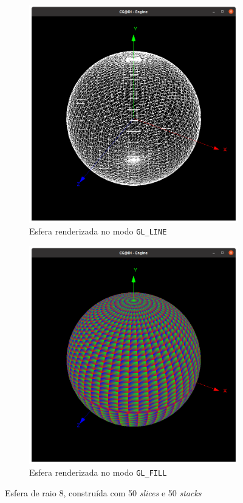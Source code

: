\documentclass[a4paper, 11pt]{article}
\begin{document}
\begin{figure}[H]
\centering
\begin{subfigure}{.5\textwidth}
    \centering
    \includegraphics[width=\textwidth]{img/esfera_linhas.png}
    \caption{Esfera renderizada no modo \texttt{GL\_LINE}}
\end{subfigure}%
\begin{subfigure}{.5\textwidth}
    \centering
    \includegraphics[width=\textwidth]{img/esfera_preenchida.png}
    \caption{Esfera renderizada no modo \texttt{GL\_FILL}}
\end{subfigure}
\caption{Esfera de raio 8, construída com 50 \textit{slices} e 50 \textit{stacks}}
\end{figure}
\end{document}
